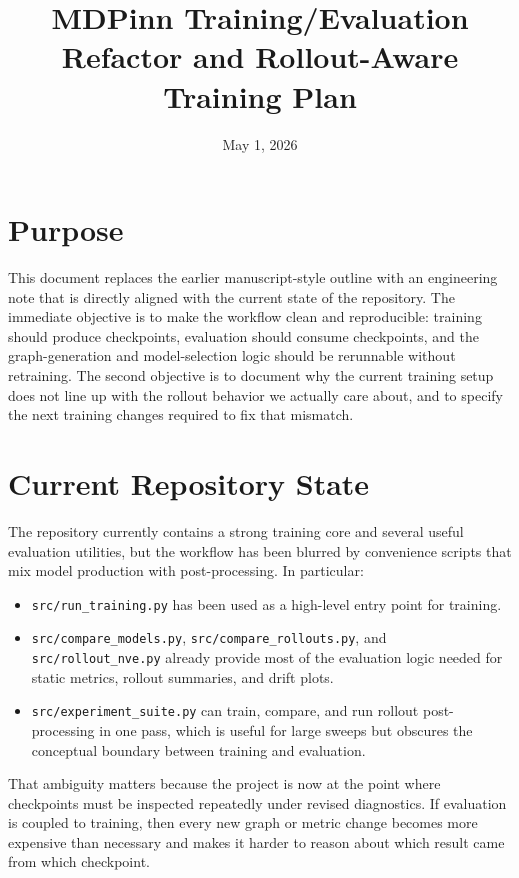 \documentclass[11pt]{article}
\begin{document}
\title{MDPinn Training/Evaluation Refactor and Rollout-Aware Training Plan}
\date{May 1, 2026}
\maketitle

\section{Purpose}

This document replaces the earlier manuscript-style outline with an engineering note that is directly aligned with the current state of the repository. The immediate objective is to make the workflow clean and reproducible: training should produce checkpoints, evaluation should consume checkpoints, and the graph-generation and model-selection logic should be rerunnable without retraining. The second objective is to document why the current training setup does not line up with the rollout behavior we actually care about, and to specify the next training changes required to fix that mismatch.

\section{Current Repository State}

The repository currently contains a strong training core and several useful evaluation utilities, but the workflow has been blurred by convenience scripts that mix model production with post-processing. In particular:

\begin{itemize}
  \item \texttt{src/run\_training.py} has been used as a high-level entry point for training.
  \item \texttt{src/compare\_models.py}, \texttt{src/compare\_rollouts.py}, and \texttt{src/rollout\_nve.py} already provide most of the evaluation logic needed for static metrics, rollout summaries, and drift plots.
  \item \texttt{src/experiment\_suite.py} can train, compare, and run rollout post-processing in one pass, which is useful for large sweeps but obscures the conceptual boundary between training and evaluation.
\end{itemize}

That ambiguity matters because the project is now at the point where checkpoints must be inspected repeatedly under revised diagnostics. If evaluation is coupled to training, then every new graph or metric change becomes more expensive than necessary and makes it harder to reason about which result came from which checkpoint.
\end{document}
